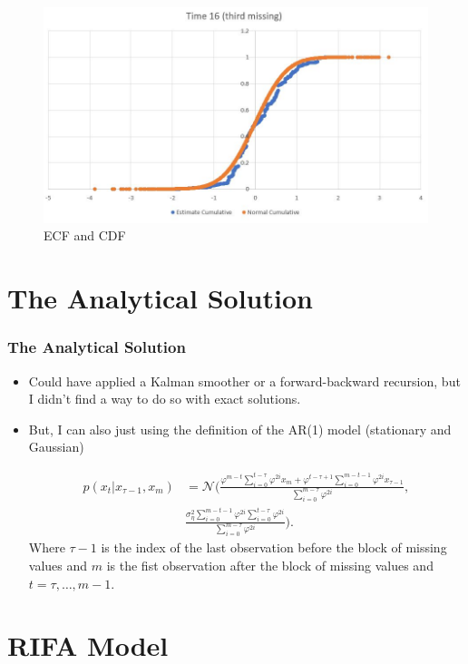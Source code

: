 \documentclass[9pt]{beamer}
\begin{document}
\begin{frame}
\begin{figure}
\begin{minipage}{0.4\textwidth}
\centering
\includegraphics[scale=0.2]{im3.JPG}
\caption{ECF and CDF}
\end{minipage}
\end{figure}
\end{frame}

\section{The Analytical Solution}
\begin{frame}
\frametitle{The Analytical Solution}
\begin{itemize}
\item Could have applied a Kalman smoother or a forward-backward recursion, but I didn't find a way to do so with exact solutions.
\item But, I can also just using the definition of the AR(1) model (stationary and Gaussian)

\begin{align*}
    p(x_t | x_{\tau-1}, x_{m}) &= \mathcal{N} \Bigg(\frac{\varphi^{m-t} \sum_{i=0}^{t-\tau} \varphi^{2i} x_{m} + \varphi^{t-\tau+1} \sum_{i=0}^{m-t-1} \varphi^{2i} x_{\tau-1}}{\sum_{i=0}^{m-\tau} \varphi^{2i}}, \\
    & \frac{\sigma^2_\eta \sum_{i=0}^{m-t-1} \varphi^{2i} \sum_{i=0}^{t-\tau} \varphi^{2i}}{\sum_{i=0}^{m-\tau} \varphi^{2i}} \Bigg).
\end{align*}
Where $\tau-1$ is the index of the last observation before the block of missing values and $m$ is the fist observation after the block of missing values and $t = \tau, \dots, m-1$.

\end{itemize}
\end{frame}

\section{RIFA Model}
\end{document}
